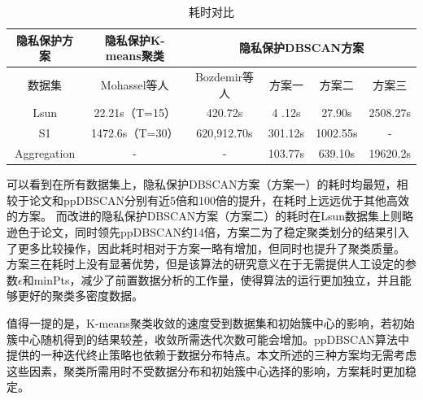 \begin{table}[!htbp]
	\centering
	\renewcommand{\arraystretch}{1.3}
	\caption{耗时对比}
	\label{s4-table-runtime}
	\begin{tabular}{c|c|c|c|c|c}
		\hline
		隐私保护方案 & 隐私保护K-means聚类                      & \multicolumn{4}{c}{隐私保护DBSCAN方案}                                 \\
		\hline
		数据集       & Mohassel等人\cite{mohassel2019practical} & Bozdemir等人\cite{bozdemir2021privacy} & 方案一  & 方案二   & 方案三   \\
		\hline
		Lsun         & 22.21s（T=15）                           & 420.72s                                & 4 .12s  & 27.90s   & 2508.27s \\
		\hline
		S1           & 1472.6s（T=30）                          & 620,912.70s                            & 301.12s & 1002.55s & -        \\
		\hline
		Aggregation  & -                                        & -                                      & 103.77s & 639.10s  & 19620.2s \\
		\hline
	\end{tabular}
\end{table}

可以看到在所有数据集上，隐私保护DBSCAN方案（方案一）的耗时均最短，相较于论文\cite{mohassel2019practical}和ppDBSCAN分别有近5倍和100倍的提升，在耗时上远远优于其他高效的方案。
而改进的隐私保护DBSCAN方案（方案二）的耗时在Lsun数据集上则略逊色于论文\cite{mohassel2019practical}，同时领先ppDBSCAN约14倍，方案二为了稳定聚类划分的结果引入了更多比较操作，因此耗时相对于方案一略有增加，但同时也提升了聚类质量。
方案三在耗时上没有显著优势，但是该算法的研究意义在于无需提供人工设定的参数$\epsilon$和minPts，减少了前置数据分析的工作量，使得算法的运行更加独立，并且能够更好的聚类多密度数据。


值得一提的是，K-means聚类收敛的速度受到数据集和初始簇中心的影响，若初始簇中心随机得到的结果较差，收敛所需迭代次数可能会增加。ppDBSCAN算法中提供的一种迭代终止策略也依赖于数据分布特点。本文所述的三种方案均无需考虑这些因素，聚类所需用时不受数据分布和初始簇中心选择的影响，方案耗时更加稳定。

